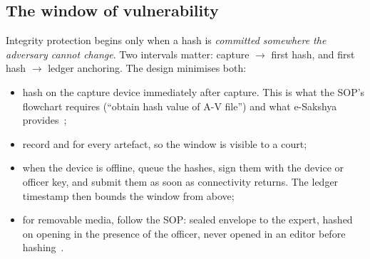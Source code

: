 \subsection{The window of vulnerability}
\label{sec:window}
Integrity protection begins only when a hash is \emph{committed somewhere the adversary cannot change}. Two intervals matter: capture $\to$ first hash, and first hash $\to$ ledger anchoring. The design minimises both:
\begin{itemize}
  \item hash on the capture device immediately after capture. This is what the SOP's flowchart requires (\enquote{obtain hash value of A-V file}) and what e-Sakshya provides~\cite{sopbnss};
  \item record  and  for every artefact, so the window is visible to a court;
  \item when the device is offline, queue the hashes, sign them with the device or officer key, and submit them as soon as connectivity returns. The ledger timestamp then bounds the window from above;
  \item for removable media, follow the SOP: sealed envelope to the expert, hashed on opening in the presence of the officer, never opened in an editor before hashing~\cite{sopbnss}.
\end{itemize}
